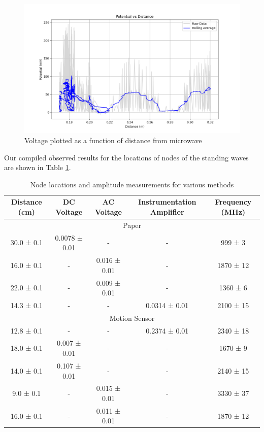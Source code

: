 \documentclass[12pt,letterpaper]{article}
\begin{document}
\begin{figure}[ht]
    \centering
    \includegraphics[width=6.5in]{images/potential_vs_distance.png}
    \caption{Voltage plotted as a function of distance from microwave}
    \label{fig:fit}
\end{figure}

Our compiled observed results for the locations of nodes of the standing waves are shown in Table \ref{tab:nodes}.

\begin{table}[h!]
    \centering
    \begin{tabular}{|c|c|c|c|c|}
        \hline
        Distance (cm) & DC Voltage & AC Voltage & Instrumentation Amplifier & Frequency (MHz) \\
        \hline
        \multicolumn{5}{|c|}{Paper} \\
        \hline
        30.0 ± 0.1 & 0.0078 ± 0.01 & - & - & 999 ± 3 \\
        \hline
        16.0 ± 0.1 & - & 0.016 ± 0.01 & - & 1870 ± 12 \\
        \hline
        22.0 ± 0.1 & - & 0.009 ± 0.01 & - & 1360 ± 6 \\
        \hline
        14.3 ± 0.1 & - & - & 0.0314 ± 0.01 & 2100 ± 15 \\
        \hline
        \multicolumn{5}{|c|}{Motion Sensor} \\
        \hline
        12.8 ± 0.1 & - & - & 0.2374 ± 0.01 & 2340 ± 18 \\
        \hline
        18.0 ± 0.1 & 0.007 ± 0.01 & - & - & 1670 ± 9 \\
        \hline
        14.0 ± 0.1 & 0.107 ± 0.01 & - & - & 2140 ± 15 \\
        \hline
        9.0 ± 0.1 & - & 0.015 ± 0.01 & - & 3330 ± 37 \\
        \hline
        16.0 ± 0.1 & - & 0.011 ± 0.01 & - & 1870 ± 12 \\
        \hline
    \end{tabular}
    \label{tab:nodes}
    \caption{Node locations and amplitude measurements for various methods}
\end{table}
\end{document}
